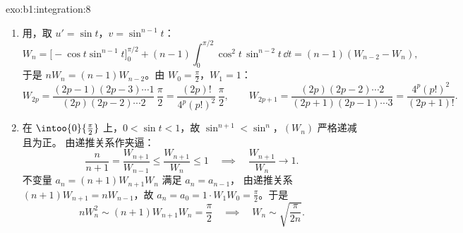 \begin{solution}{exo:b1:integration:8}
\begin{enumerate}
  \item 用，取 $u' = \sin t$，$v = \sin^{n-1} t$：
        \[
        W_n = \bigl[-\cos t\sin^{n-1}t\bigr]_0^{\pi/2}
        + (n-1)\int_0^{\pi/2} \cos^2 t\,\sin^{n-2} t\,\dd t
        = (n-1)(W_{n-2} - W_n),
        \]
        于是 $nW_n = (n-1)W_{n-2}$。由 $W_0 = \frac\pi2$，$W_1 = 1$：
        \[
        W_{2p} = \frac{(2p-1)(2p-3)\cdots 1}{(2p)(2p-2)\cdots 2}\,
        \frac{\pi}{2} = \frac{(2p)!}{4^p (p!)^2}\,\frac\pi2,
        \qquad
        W_{2p+1} = \frac{(2p)(2p-2)\cdots 2}{(2p+1)(2p-1)\cdots 3}
        = \frac{4^p (p!)^2}{(2p+1)!} .
        \]
  \item 在 $\intoo{0}{\frac\pi2}$ 上，$0 < \sin t < 1$，故 $\sin^{n+1} <
        \sin^n$，$(W_n)$ 严格递减且为正。
        由递推关系作夹逼：
        \[
        \frac{n}{n+1} = \frac{W_{n+1}}{W_{n-1}}
        \leq \frac{W_{n+1}}{W_n} \leq 1
        \quad\implies\quad \frac{W_{n+1}}{W_n} \to 1 .
        \]
        不变量 $a_n = (n+1)W_{n+1}W_n$ 满足 $a_n = a_{n-1}$，
        由递推关系 $(n+1)W_{n+1} = nW_{n-1}$，故 $a_n = a_0 =
        1 \cdot W_1 W_0 = \frac\pi2$。于是
        \[
        n W_n^2 \sim (n+1) W_{n+1} W_n = \frac\pi2
        \quad\implies\quad
        W_n \sim \sqrt{\frac{\pi}{2n}} .
        \]
\end{enumerate}
\end{solution}

